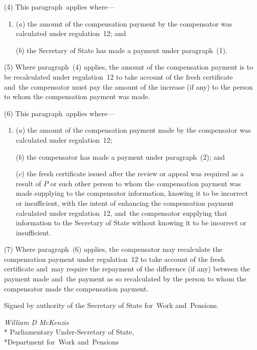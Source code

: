 \documentclass[12pt,a4paper]{article}
\begin{document}
(4) This paragraph~applies where—
\begin{enumerate}\item[]
($a$) the amount of the compensation payment by the compensator was calculated under regulation~12; and

($b$) the Secretary of State has made a payment under paragraph~(1).
\end{enumerate}

(5) Where paragraph~(4) applies, the amount of the compensation payment is to be recalculated under regulation~12 to take account of the fresh certificate and~the compensator must pay the amount of the increase (if any) to the person to whom the compensation payment was made.

(6) This paragraph~applies where—
\begin{enumerate}\item[]
($a$) the amount of the compensation payment made by the compensator was calculated under regulation~12;

($b$) the compensator has made a payment under paragraph~(2); and

($c$) the fresh certificate issued after the review or appeal was required as a result of $P$ or such other person to whom the compensation payment was made supplying to the compensator information, knowing it to be incorrect or insufficient, with the intent of enhancing the compensation payment calculated under regulation~12, and~the compensator supplying that information to the Secretary of State without knowing it to be incorrect or insufficient.
\end{enumerate}

(7) Where paragraph~(6) applies, the compensator may recalculate the compensation payment under regulation~12 to take account of the fresh certificate and~may require the repayment of the difference (if any) between the payment made and~the payment as so recalculated by the person to whom the compensator made the compensation payment. 

\bigskip

Signed 
by authority of the 
Secretary of State for~Work and~Pensions.

{\raggedleft
\emph{William D McKenzie}\\*
Parliamentary Under-Secretary 
of State,\\*Department 
for~Work and~Pensions

}
\end{document}
